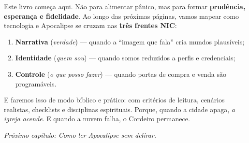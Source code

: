 Este livro começa aqui. Não para alimentar pânico, mas para formar \textbf{prudência, esperança e fidelidade}. Ao longo das próximas páginas, vamos mapear como tecnologia e Apocalipse se cruzam nas \textbf{três frentes NIC}:
\begin{enumerate}[leftmargin=*,nosep]
  \item \textbf{Narrativa} (\textit{verdade}) --- quando a “imagem que fala” cria mundos plausíveis;
  \item \textbf{Identidade} (\textit{quem sou}) --- quando somos reduzidos a perfis e credenciais;
  \item \textbf{Controle} (\textit{o que posso fazer}) --- quando portas de compra e venda são programáveis.
\end{enumerate}

E faremos isso de modo bíblico e prático: com critérios de leitura, cenários realistas, checklists e disciplinas espirituais. Porque, quando a cidade apaga, \textit{a igreja acende}. E quando a nuvem falha, o Cordeiro permanece.

\bigskip
\noindent\textit{Próximo capítulo: Como ler Apocalipse sem delirar.}
